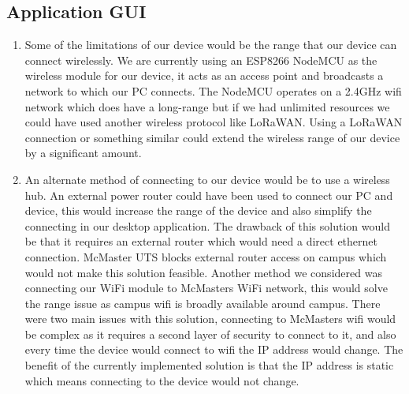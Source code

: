 \documentclass[12pt, titlepage]{article}
\begin{document}
\subsection{Application GUI}
\begin{enumerate}
  \item Some of the limitations of our device would be the range that our device can connect wirelessly. We are currently using an ESP8266 NodeMCU as the wireless module for our device, it acts as an access point and broadcasts a network to which our PC connects. The NodeMCU operates on a 2.4GHz wifi network which does have a long-range but if we had unlimited resources we could have used another wireless protocol like LoRaWAN. Using a LoRaWAN connection or something similar could extend the wireless range of our device by a significant amount.
  \item An alternate method of connecting to our device would be to use a wireless hub. An external power router could have been used to connect our PC and device, this would increase the range of the device and also simplify the connecting in our desktop application. The drawback of this solution would be that it requires an external router which would need a direct ethernet connection. McMaster UTS blocks external router access on campus which would not make this solution feasible. Another method we considered was connecting our WiFi module to McMasters WiFi network, this would solve the range issue as campus wifi is broadly available around campus. There were two main issues with this solution, connecting to McMasters wifi would be complex as it requires a second layer of security to connect to it, and also every time the device would connect to wifi the IP address would change. The benefit of the currently implemented solution is that the IP address is static which means connecting to the device would not change.
\end{enumerate}
\end{document}
